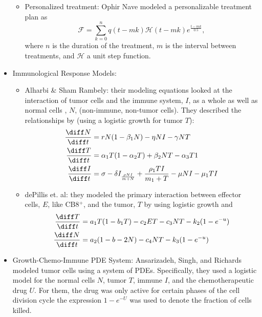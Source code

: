 \documentclass[11pt]{amsart}
\begin{document}
\begin{itemize}
\begin{itemize}
			\item Personalized treatment: Ophir Nave modeled a personalizable treatment plan as 
				\begin{equation}
					\mathscr{F} = \sum_{k=0}^n q(t-mk) \mathscr{H} (t-mk)e^{\frac{t-mk}{0.5}}\label{eq: NavePersonalChemo},
				\end{equation}
				where $n$ is the duration of the treatment, $m$ is the interval between treatments, and $\mathscr{H}$ a unit step function.
		\end{itemize}
	\item Immunological Response Models:
		\begin{itemize}
			\item Alharbi \& Sham Rambely: their modeling equations looked at the interaction of tumor cells and the immune system, $I$, as a whole as well as normal cells , $N$, (non-immune, non-tumor cells). They described the relationships by (using a logistic growth for tumor $T$):
				\begin{eqnarray}
					\begin{aligned}
						\frac{\diff N}{\diff t} &= rN(1-\beta_1 N) - \eta NI - \gamma NT \\
						\frac{\diff T}{\diff t} &= \alpha_1T(1-\alpha_2T) + \beta_2 NT - \alpha_3 T1 \\
						\frac{\diff I}{\diff t} &= \sigma - \delta I _ \frac{\rho N I}{m+N} + \frac{\rho_1 TI}{m_1 + T} - \mu NI - \mu_1 TI \label{eq: AlharbiTumorImmuno}
					\end{aligned}
				\end{eqnarray}
			\item dePillis et. al: they modeled the primary interaction between effector cells, $E$, like CB8$^+$, and the tumor, $T$ by using logistic growth and 
				\begin{eqnarray}
					\begin{aligned}
						\frac{\diff T}{\diff t} &= a_1T(1-b_1T) - c_2ET - c_3NT - k_2(1-e^{-u}) \\
						\frac{\diff N}{\diff t} &= a_2(1-b-2N) - c_4NT - k_3 (1-e^{-u})\label{eq: dePillisTumorImmuno}
					\end{aligned}
				\end{eqnarray}
		\end{itemize}
	\item Growth-Chemo-Immune PDE System: Ansarizadeh, Singh, and Richards modeled tumor cells using a system of PDEs. Specifically, they used a logistic model for the normal cells $N$, tumor $T$, immune $I$, and the chemotherapeutic drug $U$. For them, the drug was only active for certain phases of the cell division cycle the expression $1-e^{-U}$ was used to denote the fraction of cells killed.

\end{itemize}
\end{document}
